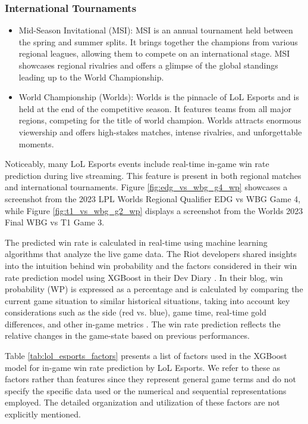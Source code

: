 \documentclass[11pt,a4paper,oneside]{report}
\begin{document}
\subsubsection{International Tournaments}

\begin{itemize}
  \item Mid-Season Invitational (MSI): MSI is an annual tournament held between the spring and summer splits. It brings together the champions from various regional leagues, allowing them to compete on an international stage. MSI showcases regional rivalries and offers a glimpse of the global standings leading up to the World Championship.
  \item World Championship (Worlds): Worlds is the pinnacle of LoL Esports and is held at the end of the competitive season. It features teams from all major regions, competing for the title of world champion. Worlds attracts enormous viewership and offers high-stakes matches, intense rivalries, and unforgettable moments.
\end{itemize}

Noticeably, many LoL Esports events include real-time in-game win rate prediction during live streaming. This feature is present in both regional matches and international tournaments. Figure \ref{fig:edg_vs_wbg_g4_wp} showcases a screenshot from the 2023 LPL Worlds Regional Qualifier EDG vs WBG Game 4, while Figure \ref{fig:t1_vs_wbg_g2_wp} displays a screenshot from the Worlds 2023 Final WBG vs T1 Game 3.

The predicted win rate is calculated in real-time using machine learning algorithms that analyze the live game data. The Riot developers shared insights into the intuition behind win probability and the factors considered in their win rate prediction model using XGBoost \cite{xgboost} in their Dev Diary \cite{lol-esports-2023}. In their blog, win probability (WP) is expressed as a percentage and is calculated by comparing the current game situation to similar historical situations, taking into account key considerations such as the side (red vs. blue), game time, real-time gold differences, and other in-game metrics \cite{lol-esports-2023}. The win rate prediction reflects the relative changes in the game-state based on previous performances.

Table \ref{tab:lol_esports_factors} presents a list of factors used in the XGBoost model for in-game win rate prediction by LoL Esports. We refer to these as factors rather than features since they represent general game terms and do not specify the specific data used or the numerical and sequential representations employed. The detailed organization and utilization of these factors are not explicitly mentioned.
\end{document}
